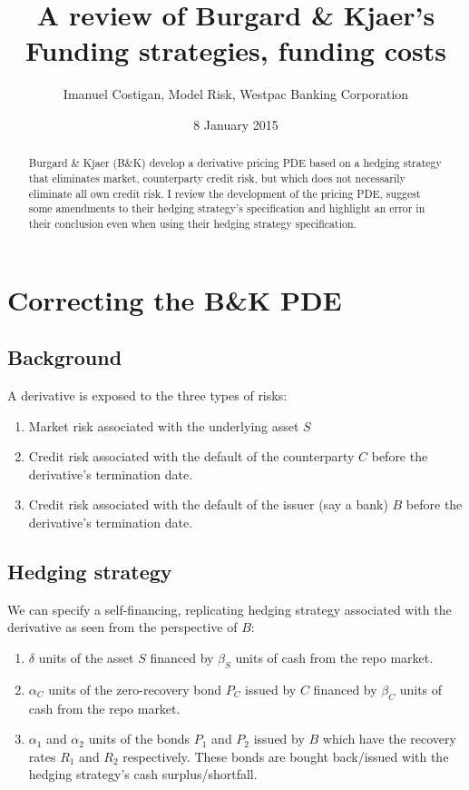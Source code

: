 \documentclass{tufte-handout}
\title{A review of Burgard \& Kjaer's Funding strategies, funding costs}
\author{Imanuel Costigan, Model Risk, Westpac Banking Corporation}
\date{8 January 2015}  %
\begin{document}
\maketitle%

\begin{abstract}
\noindent Burgard \& Kjaer (B\&K) \cite{bkfunding2013up} develop a derivative
pricing PDE based on a hedging strategy that eliminates market, counterparty
credit risk, but which does not necessarily eliminate all own credit risk. I
review the development of the pricing PDE, suggest some amendments to their
hedging strategy's specification and highlight an error in their conclusion
even when using their hedging strategy specification.
\end{abstract}

\section{Correcting the B\&K PDE}\label{sec:correction}

\subsection{Background}

A derivative is exposed to the three types of risks:

\begin{enumerate}
\item Market risk associated with the underlying asset $S$
\item Credit risk associated with the default of the counterparty $C$ before the
derivative's termination date.
\item Credit risk associated with the default of the issuer (say a bank) $B$
before the derivative's termination date.
\end{enumerate}

\subsection{Hedging strategy}\label{sec:dynhedging}

We can specify a self-financing, replicating hedging strategy associated with the
derivative as seen from the perspective of $B$:

\begin{enumerate}
\item $\delta$ units of the asset $S$ financed by $\beta_S$ units of cash
from the repo market.
\item $\alpha_C$ units of the zero-recovery bond $P_C$ issued by $C$ financed
by $\beta_C$ units of cash from the repo market.
\item $\alpha_1$ and $\alpha_2$ units of the bonds $P_1$ and $P_2$ issued
by $B$ which have the recovery rates $R_1$ and $R_2$ respectively.
These bonds are bought back/issued with the hedging strategy's cash
surplus/shortfall.
\end{enumerate}
\end{document}
